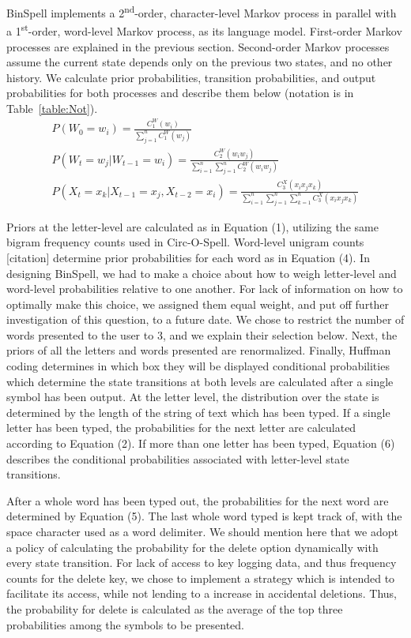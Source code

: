 \documentclass[12pt,titlepage]{article}
\begin{document}
BinSpell implements a 2\textsuperscript{nd}-order, character-level Markov process in parallel with a 1\textsuperscript{st}-order, word-level 
Markov process, as its language model.  First-order Markov processes are explained in the previous 
section.  Second-order Markov processes assume the current state depends only on the previous two 
states, and no other history.  We calculate prior probabilities, transition probabilities, and output 
probabilities for both processes and describe them below (notation is in Table~\ref{table:Not}).
\begin{gather*}
P(W_0 = w_i) = \frac{C_1^W(w_i)}{\displaystyle \sum_{j=1}^n C_1^W(w_j)} \tag{4} \\
P(W_t = w_j | W_{t-1} = w_i) = \frac{C_2^W(w_i w_j)}{\displaystyle \sum_{i=1}^n \sum_{j=1}^n C_2^W(w_i w_j)} \tag{5} \\
P(X_t = x_k | X_{t-1} = x_j, X_{t-2} = x_i) = \frac{C_3^X(x_i x_j x_k)}{\displaystyle \sum_{i=1}^n \sum_{j=1}^n \sum_{k=1}^n C_3^X(x_i x_j x_k)} \tag{6}
\end{gather*}

Priors at the letter-level are calculated as in Equation (1), utilizing the same bigram frequency counts 
used in Circ-O-Spell.  Word-level unigram counts [citation] determine prior probabilities for each word 
as in Equation (4).  In designing BinSpell, we had to make a choice about how to weigh letter-level and 
word-level probabilities relative to one another.  For lack of information on how to optimally make this 
choice, we assigned them equal weight, and put off further investigation of this question, to a future 
date.  We chose to restrict the number of words presented to the user to 3, and we explain their 
selection below.  Next, the priors of all the letters and words presented are renormalized.  Finally, 
Huffman coding determines in which box they will be displayed conditional probabilities which 
determine the state transitions at both levels are calculated after a single symbol has been output.  At 
the letter level, the distribution over the state is determined by the length of the string of text which has 
been typed.  If a single letter has been typed, the probabilities for  the next letter are calculated 
according to Equation (2).  If more than one letter has been typed, Equation (6) describes the 
conditional probabilities associated with letter-level state transitions.

After a whole word has been typed out, the probabilities for the next word are determined by Equation 
(5).  The last whole word typed is kept track of, with the space character used as a word delimiter.  We 
should mention here that we adopt a policy of calculating the probability for the delete option 
dynamically with every state transition.  For lack of access to key logging data, and thus frequency 
counts for the delete key, we chose to implement a strategy which is intended to facilitate its access, 
while not lending to a increase in accidental deletions.   Thus, the probability for delete is calculated as 
the average of the top three probabilities among the symbols to be presented.
\end{document}

